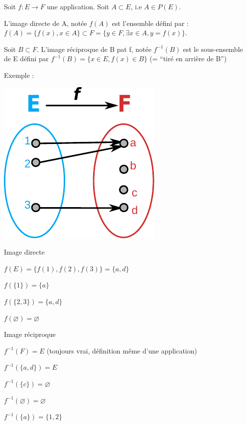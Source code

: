 \documentclass[french]{yLectureNote}
\begin{document}
\yOrnament
\begin{theorem}[Définitions]
Soit $f:E \rightarrow F$ une application. Soit $A\subset E$, i.e $A\in P(E)$.

L'image directe de A, notée $f(A)$ est l'ensemble défini par : $f(A) = \{f(x),x\in A\} \subset F = \{y\in F, \exists x\in A, y=f(x)\}$.

Soit $B\subset F$. L'image réciproque de B pat f, notée $f^{-1}(B)$ est le sous-ensemble de E défini par $f^{-1}(B)=\{x\in E, f(x)\in B\}$ (= ``tiré en arrière de B'')
\end{theorem}
Exemple :

\includegraphics[scale=0.8]{app-ex}

Image directe

$f(E) = \{f(1),f(2),f(3)\} = \{a,d\}$

$f(\{1\}) = \{a\}$

$f(\{2,3\}) = \{a,d\}$

$f(\varnothing) = \varnothing$

Image réciproque

$f^{-1}(F) = E$ (toujours vrai, définition m\^eme d'une application)

$f^{-1}(\{a,d\}) = E$

$f^{-1}(\{c\}) = \varnothing$

$f^{-1}(\varnothing) = \varnothing$

$f^{-1}(\{a\}) = \{1,2\}$

\end{document}
